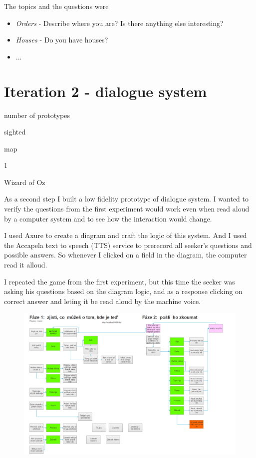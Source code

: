 	The topics and the questions were
	\begin{itemize}
		\item \emph{Orders} - Describe where you are? Is there anything else interesting?
		\item \emph{Houses} - Do you have houses?
		\item ...
	\end{itemize}
	
		
	\section{Iteration 2 - dialogue system}
	\begin{labeling}{number of prototypes}
		\item [people] sighted
		\item [environment] map
		\item [number of prototypes] 1
		\item [implementation] Wizard of Oz
	\end{labeling}
	As a second step I built a low fidelity prototype of dialogue system. I wanted to verify the questions from the first experiment would work even when read aloud by a computer system and to see how the interaction would change.
	
	 I used Axure\cite{axure} to create a diagram and craft the logic of this system. And I used the Accapela text to speech (TTS) service\cite{accapela} to prerecord all seeker's questions and possible answers. So whenever I clicked on a field in the diagram, the computer read it alloud.
	 
	  I repeated the game from the first experiment, but this time the seeker was asking his questions based on the diagram logic, and as a response clicking on correct answer and leting it be read aloud by the machine voice.
	 
\begin{figure}[h]
	\centering
	\includegraphics[width=0.7\linewidth]{figures/2ndExp-human2WoZOverMap/tested-dialogue}
	\caption[Dialogue]{}
	\caption{}
	\label{fig:tested-dialogue}
\end{figure}


